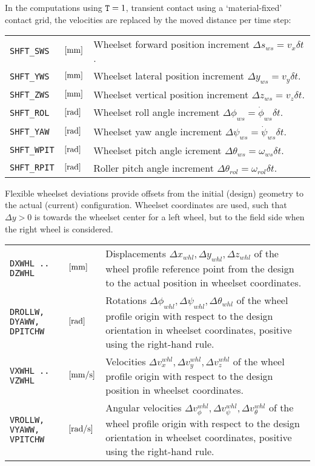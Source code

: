 \documentclass[12pt]{report}
\renewcommand{\magenta}[1]{}
\newenvironment{inputvars}{\vspace{0.4\baselineskip}%

\begin{tabular}{>{\raggedright}p{22mm}p{19mm}p{113mm}}}{
\end{tabular}

}
\newcommand{\inpvar}[3]{{\small\tt #1} & $#2$ & #3 \\[1ex]}
\begin{document}
In the computations using ${\tt T}=1$, transient contact using a
`material-fixed' contact grid, the velocities are replaced by the moved
distance per time step:
\begin{inputvars}
\inpvar{SHFT\_SWS}{\bunit{mm}}{Wheelset forward position increment
        $\Delta s_{ws}= v_x\delta t$.}
\inpvar{SHFT\_YWS}{\bunit{mm}}{Wheelset lateral position increment
        $\Delta y_{ws}= v_y\delta t$.}
\inpvar{SHFT\_ZWS}{\bunit{mm}}{Wheelset vertical position increment
        $\Delta z_{ws}=v_z\delta t$.}
\inpvar{SHFT\_ROL}{\bunit{rad}}{Wheelset roll angle increment
        $\Delta\phi_{ws}=\dot{\phi}_{ws}\delta t$.}
\inpvar{SHFT\_YAW}{\bunit{rad}}{Wheelset yaw angle increment
        $\Delta\psi_{ws}=\dot{\psi}_{ws}\delta t$.}
\inpvar{SHFT\_WPIT}{\bunit{rad}}{Wheelset pitch angle icrement
        $\Delta\theta_{ws}=\omega_{ws}\delta t$. \magenta{Output when 
        ${\tt F}_1=1$ or $2$.}}
\inpvar{SHFT\_RPIT}{\bunit{rad}}{Roller pitch angle increment
        $\Delta\theta_{rol}= \omega_{rol}\delta t$.}
\end{inputvars}
Flexible wheelset deviations provide offsets from the initial (design)
geometry to the actual (current) configuration. Wheelset coordinates are
used, such that $\Delta y>0$ is towards the wheelset center for a left
wheel, but to the field side when the right wheel is considered.
\begin{inputvars}
\inpvar{DXWHL .. \mbox{\hspace{4mm}DZWHL}}{\bunit{mm}}{Displacements 
        $\Delta x_{whl}, \Delta y_{whl}, \Delta z_{whl}$ of the wheel
        profile reference point from the design to the actual position
        in wheelset coordinates.}
\inpvar{DROLLW, \mbox{\hspace{4mm}DYAWW}, \mbox{\hspace{4mm}DPITCHW}}{
        \bunit{rad}}{Rotations $\Delta\phi_{whl}, \Delta\psi_{whl}, 
        \Delta\theta_{whl}$ of the wheel profile origin with respect to
        the design orientation in wheelset coordinates, positive using
        the right-hand rule.}
\inpvar{VXWHL .. \mbox{\hspace{4mm}VZWHL}}{\bunit{mm/s}}{Velocities 
        $\Delta v_x^{whl}, \Delta v_y^{whl}, \Delta v_z^{whl}$ of the
        wheel profile origin with respect to the design position in
        wheelset coordinates.}
\inpvar{VROLLW, \mbox{\hspace{4mm}VYAWW}, \mbox{\hspace{4mm}VPITCHW}}{
        \bunit{rad/s}}{Angular velocities $\Delta v_\phi^{whl}, 
        \Delta v_\psi^{whl}, \Delta v_\theta^{whl}$ of the wheel profile
        origin with respect to the design orientation in wheelset
        coordinates, positive using the right-hand rule.}
\end{inputvars}
 
\end{document}
